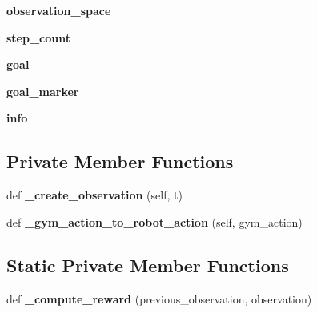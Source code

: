 \begin{DoxyCompactItemize}
{\bfseries observation\+\_\+space}
\item 
\mbox{\label{classexample__pushing__training__env_1_1ExamplePushingTrainingEnv_a28d37c465544f27018ebf1d9a215604e}} 
{\bfseries step\+\_\+count}
\item 
\mbox{\label{classexample__pushing__training__env_1_1ExamplePushingTrainingEnv_afb6af65aa630dfbd82a377f7116dc218}} 
{\bfseries goal}
\item 
\mbox{\label{classexample__pushing__training__env_1_1ExamplePushingTrainingEnv_a364d2a71dace6a8d7aa7853711284279}} 
{\bfseries goal\+\_\+marker}
\item 
\mbox{\label{classexample__pushing__training__env_1_1ExamplePushingTrainingEnv_a3fe1c7b6d4b868f82e6d526642b10c91}} 
{\bfseries info}
\end{DoxyCompactItemize}
\subsection*{Private Member Functions}
\begin{DoxyCompactItemize}
\item 
\mbox{\label{classexample__pushing__training__env_1_1ExamplePushingTrainingEnv_afbb847a8de2b991324ec7c6e55e1ba5a}} 
def {\bfseries \+\_\+create\+\_\+observation} (self, t)
\item 
\mbox{\label{classexample__pushing__training__env_1_1ExamplePushingTrainingEnv_a1e3940e8da32823a3e18e58bb0925285}} 
def {\bfseries \+\_\+gym\+\_\+action\+\_\+to\+\_\+robot\+\_\+action} (self, gym\+\_\+action)
\end{DoxyCompactItemize}
\subsection*{Static Private Member Functions}
\begin{DoxyCompactItemize}
\item 
\mbox{\label{classexample__pushing__training__env_1_1ExamplePushingTrainingEnv_ae9b0a300dcce6c7ebc7a5b85d11f3651}} 
def {\bfseries \+\_\+compute\+\_\+reward} (previous\+\_\+observation, observation)
\end{DoxyCompactItemize}


